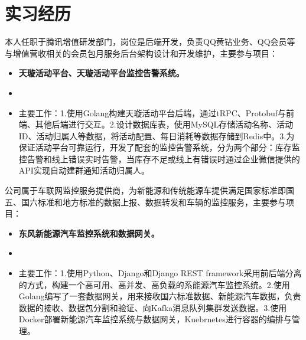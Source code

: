 \documentclass{resume}
\begin{document}

\section{实习经历}
\begin{onehalfspacing}
本人任职于腾讯增值研发部门，岗位是后端开发，负责QQ黄钻业务、QQ会员等与增值营收相关的会员包月服务后台架构设计和开发维护，主要参与项目：
\begin{itemize}
  \item \textbf{天璇活动平台、天璇活动平台监控告警系统。}
  \item {}
  \item 主要工作：1.使用Golang构建天璇活动平台后端，通过tRPC、Protobuf与前端、其他后端进行交互。2.设计数据库表，使用MySQL存储活动名称、活动ID、活动归属人等数据，将活动配置、每日消耗等数据存储到Redis中。3.为保证活动平台可靠运行，开发了配套的监控告警系统，分为两个部分：库存监控告警和线上错误实时告警，当库存不足或线上有错误时通过企业微信提供的API实现自动建群通知活动归属人。
\end{itemize}
\end{onehalfspacing}

\begin{onehalfspacing}
公司属于车联网监控服务提供商，为新能源和传统能源车提供满足国家标准即国五、国六标准和地方标准的数据上报、数据转发和车辆的监控服务，主要参与项目：
\begin{itemize}
  \item \textbf{东风新能源汽车监控系统和数据网关。}
  \item {}
  \item 主要工作：1.使用Python、Django和Django REST framework采用前后端分离的方式，构建一个高可用、高并发、高负载的系能源汽车监控系统。2.使用Golang编写了一套数据网关，用来接收国六标准数据、新能源汽车数据，负责数据的接收、数据包分割和验证、向Kafka消息队列集群发送数据。3.使用Docker部署新能源汽车监控系统与数据网关，Kuebrnetes进行容器的编排与管理。
\end{itemize}
\end{onehalfspacing}


%
%
\end{document}
